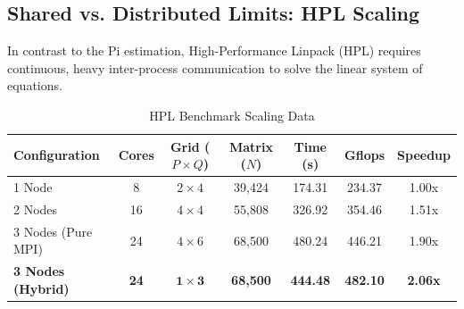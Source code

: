 \documentclass[11pt]{article}
\begin{document}
\subsection{Shared vs. Distributed Limits: HPL Scaling}
In contrast to the Pi estimation, High-Performance Linpack (HPL) requires continuous, heavy inter-process communication to solve the linear system of equations.

\begin{table}[H]
  \centering
  \caption{HPL Benchmark Scaling Data}
  \label{tab:performance}
  \begin{tabular}{lcccccc}
    \toprule
    \textbf{Configuration} & \textbf{Cores} & \textbf{Grid ($P \times Q$)} & \textbf{Matrix ($N$)} & \textbf{Time (s)} & \textbf{Gflops} & \textbf{Speedup} \\
    \midrule
    1 Node & 8 & $2 \times 4$ & 39,424 & 174.31 & 234.37 & 1.00x \\
    2 Nodes & 16 & $4 \times 4$ & 55,808 & 326.92 & 354.46 & 1.51x \\
    3 Nodes (Pure MPI) & 24 & $4 \times 6$ & 68,500 & 480.24 & 446.21 & 1.90x \\
    \textbf{3 Nodes (Hybrid)} & \textbf{24} & $\mathbf{1 \times 3}$ & \textbf{68,500} & \textbf{444.48} & \textbf{482.10} & \textbf{2.06x} \\
    \bottomrule
  \end{tabular}
\end{table}
\end{document}

